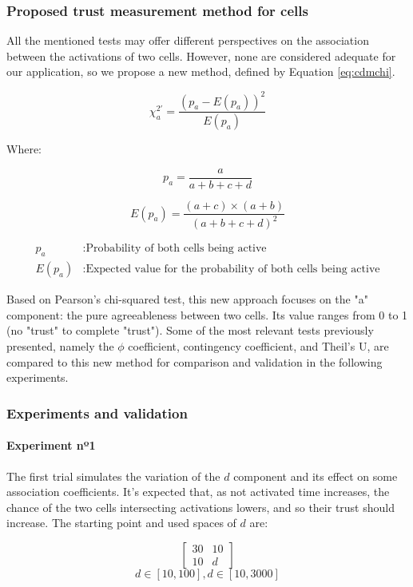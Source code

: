 \subsubsection{Proposed trust measurement method for cells}

All the mentioned tests may offer different perspectives on the association between the activations of two cells. However, none are considered adequate for our application, so we propose a new method, defined by Equation \ref{eq:cdmchi}.

\begin{equation} \label{eq:cdmchi}
    \chi_a^{2'} = \frac{(p_a - E(p_a))^2}{E(p_a)}
\end{equation}

Where:

\[
    p_a = \frac{a}{a+b+c+d}
\]

\[
    E(p_a) = \frac{(a + c) \times (a + b)}{(a+b+c+d)^2}
\]

\begin{align*}
    p_a &: \text{Probability of both cells being active} \\
    E(p_a) &: \text{Expected value for the probability of both cells being active}
\end{align*}

Based on Pearson's chi-squared test, this new approach focuses on the "a" component: the pure agreeableness between two cells. Its value ranges from 0 to 1 (no "trust" to complete "trust"). Some of the most relevant tests previously presented, namely the $\phi$ coefficient, contingency coefficient, and Theil's U, are compared to this new method for comparison and validation in the following experiments.

\subsubsection{Experiments and validation}

\paragraph{Experiment nº1}

The first trial simulates the variation of the $d$ component and its effect on some association coefficients. It's expected that, as not activated time increases, the chance of the two cells intersecting activations lowers, and so their trust should increase. The starting point and used spaces of $d$ are:

$$
\begin{bmatrix}
    30 & 10 \\ 10 & d
\end{bmatrix}
$$
$$
d \in [10, 100], d \in [10, 3000]
$$

